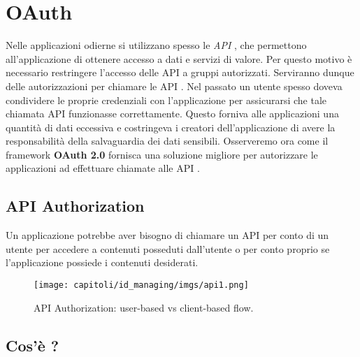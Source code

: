 \newcommand{\api}{API \emoji{bee}}

\chapter{OAuth}

\vspace{-3em}

Nelle applicazioni odierne si utilizzano spesso le \textit{API} , che permettono
all'applicazione di ottenere accesso a dati e servizi di valore. Per questo motivo
è necessario restringere l'accesso delle \api{} a gruppi autorizzati. Serviranno dunque
delle autorizzazioni per chiamare le \api{}. Nel passato un utente spesso doveva condividere
le proprie credenziali con l'applicazione per assicurarsi che tale chiamata \api{}
funzionasse correttamente. Questo forniva alle applicazioni una quantità di dati
eccessiva e costringeva i creatori dell'applicazione di avere la responsabilità
della salvaguardia dei dati sensibili. Osserveremo ora come il framework
\textbf{OAuth 2.0} fornisca una soluzione migliore per autorizzare le applicazioni
ad effettuare chiamate alle \api{}.

\vspace{-1em}

\section{API Authorization}

Un applicazione potrebbe aver bisogno di chiamare un \api{} per conto di un utente
per accedere a contenuti posseduti dall'utente o per conto proprio se l'applicazione
possiede i contenuti desiderati.

\begin{figure}[H]
      \centering
      \texttt{[image: capitoli/id\_managing/imgs/api1.png]}
      \vspace{-0.5em}
      \caption{\api{} Authorization: user-based vs client-based flow.}
\end{figure}

\section{Cos'è ?}

